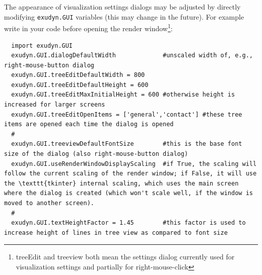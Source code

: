 The appearance of visualization settings dialogs may be adjusted by directly modifying \texttt{exudyn.GUI} variables (this may change in the future). For example write in your code before opening the render window\footnote{treeEdit and treeview both mean the settings dialog currently used for visualization settings and partially for right-mouse-click}:
\pythonstyle\begin{lstlisting}
  import exudyn.GUI
  exudyn.GUI.dialogDefaultWidth             #unscaled width of, e.g., right-mouse-button dialog
  exudyn.GUI.treeEditDefaultWidth = 800
  exudyn.GUI.treeEditDefaultHeight = 600
  exudyn.GUI.treeEditMaxInitialHeight = 600 #otherwise height is increased for larger screens
  exudyn.GUI.treeEditOpenItems = ['general','contact'] #these tree items are opened each time the dialog is opened
  #
  exudyn.GUI.treeviewDefaultFontSize        #this is the base font size of the dialog (also right-mouse-button dialog)
  exudyn.GUI.useRenderWindowDisplayScaling  #if True, the scaling will follow the current scaling of the render window; if False, it will use the \texttt{tkinter} internal scaling, which uses the main screen where the dialog is created (which won't scale well, if the window is moved to another screen).
  #
  exudyn.GUI.textHeightFactor = 1.45        #this factor is used to increase height of lines in tree view as compared to font size
\end{lstlisting}
%
